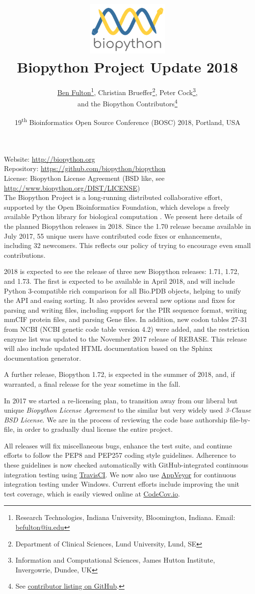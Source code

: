 \documentclass[10pt,oneside]{article}
\title{%
\vspace{-1.5in}
\includegraphics[width=0.3\textwidth]{biopython_logo_s.png} \\
\vspace{3mm}Biopython Project Update 2018}
\author{
	\underline{Ben Fulton}\thanks{Research Technologies, Indiana University, Bloomington, Indiana. Email: \href{mailto:befulton@iu.edu}{befulton@iu.edu}},
    Christian Brueffer\thanks{Department of Clinical Sciences, Lund University, Lund, SE},
    Peter Cock\thanks{Information and Computational Sciences, James Hutton Institute, Invergowrie, Dundee, UK},\\
    and the Biopython Contributors\thanks{See \href{https://github.com/biopython/biopython/blob/master/CONTRIB.rst}{contributor listing on GitHub}.}}
\date{19\textsuperscript{th} Bioinformatics Open Source Conference (BOSC) 2018, Portland, USA}
\begin{document}
\maketitle
\thispagestyle{empty}

\vspace{-0.2in}
\noindent
Website: \url{http://biopython.org} \\
Repository: \url{https://github.com/biopython/biopython} \\
License: Biopython License Agreement (BSD like, see \url{http://www.biopython.org/DIST/LICENSE}) \\

The Biopython Project is a long-running distributed collaborative effort,
supported by the Open Bioinformatics Foundation, which develops a freely
available Python library for biological computation \cite{AppNote}.
We present here details of the planned Biopython releases in 2018. 
Since the 1.70 release 
became available in July 2017, 55 unique users have contributed code 
fixes or enhancements, including 32 newcomers. This reflects our policy of
trying to encourage even small contributions.

2018 is expected to see the release of three new Biopython releases: 1.71, 1.72,
and 1.73. The first is expected to be available in April 2018, and will include
Python 3-compatible rich
comparison for all Bio.PDB objects, helping to unify the API and easing sorting.
It also provides several new options and fixes for parsing and writing files, 
including support for the PIR sequence format, writing mmCIF protein files, and parsing Gene files.
In addition, new codon tables 27-31 from NCBI (NCBI genetic code table version 4.2) were added,
and the restriction enzyme list was updated to the November 2017 release of REBASE.
This release will also include updated HTML
documentation based on the Sphinx documentation generator.

A further release, Biopython 1.72, is expected in the summer of 2018, and, if
warranted, a final release for the year sometime in the fall.

In 2017 we started a re-licensing plan, to transition away
from our liberal but unique \emph{Biopython License Agreement} to the similar
but very widely used \emph{3-Clause BSD License}. We are in the process of 
reviewing the code base authorship file-by-file, in order to gradually dual 
license the entire project.

All releases will fix miscellaneous bugs, enhance the test suite,
and continue efforts to follow the PEP8 and PEP257 coding style guidelines.
Adherence to these guidelines is now checked automatically with GitHub-integrated continuous integration
testing using \href{https://travis-ci.org/biopython/biopython/builds}{TravisCI}.
We now also use \href{https://ci.appveyor.com/project/biopython/biopython/history}{AppVeyor}
for continuous integration testing under Windows.
Current efforts include improving the unit test coverage, which is easily viewed
online at \href{https://codecov.io/github/biopython/biopython/}{CodeCov.io}.
\end{document}
